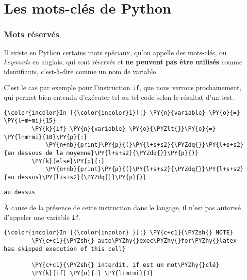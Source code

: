     
    
    
    

    

    \hypertarget{les-mots-cluxe9s-de-python}{%
\section{Les mots-clés de Python}\label{les-mots-cluxe9s-de-python}}

    \hypertarget{mots-ruxe9servuxe9s}{%
\subsubsection{Mots réservés}\label{mots-ruxe9servuxe9s}}

    Il existe en Python certains mots spéciaux, qu'on appelle des mots-clés,
ou \emph{keywords} en anglais, qui sont réservés et \textbf{ne peuvent
pas être utilisés} comme identifiants, c'est-à-dire comme un nom de
variable.

    C'est le cas par exemple pour l'instruction \texttt{if}, que nous
verrons prochainement, qui permet bien entendu d'exécuter tel ou tel
code selon le résultat d'un test.

    \begin{Verbatim}[commandchars=\\\{\}]
{\color{incolor}In [{\color{incolor}1}]:} \PY{n}{variable} \PY{o}{=} \PY{l+m+mi}{15}
        \PY{k}{if} \PY{n}{variable} \PY{o}{\PYZlt{}}\PY{o}{=} \PY{l+m+mi}{10}\PY{p}{:}
            \PY{n+nb}{print}\PY{p}{(}\PY{l+s+s2}{\PYZdq{}}\PY{l+s+s2}{en dessous de la moyenne}\PY{l+s+s2}{\PYZdq{}}\PY{p}{)}
        \PY{k}{else}\PY{p}{:}
            \PY{n+nb}{print}\PY{p}{(}\PY{l+s+s2}{\PYZdq{}}\PY{l+s+s2}{au dessus}\PY{l+s+s2}{\PYZdq{}}\PY{p}{)}
\end{Verbatim}


    \begin{Verbatim}[commandchars=\\\{\}]
au dessus

    \end{Verbatim}

    À cause de la présence de cette instruction dans le langage, il n'est
pas autorisé d'appeler une variable \texttt{if}.

    \begin{Verbatim}[commandchars=\\\{\}]
{\color{incolor}In [{\color{incolor} }]:} \PY{c+c1}{\PYZsh{} NOTE}
        \PY{c+c1}{\PYZsh{} auto\PYZhy{}exec\PYZhy{}for\PYZhy{}latex has skipped execution of this cell}
        
        \PY{c+c1}{\PYZsh{} interdit, if est un mot\PYZhy{}clé}
        \PY{k}{if} \PY{o}{=} \PY{l+m+mi}{1}
\end{Verbatim}


